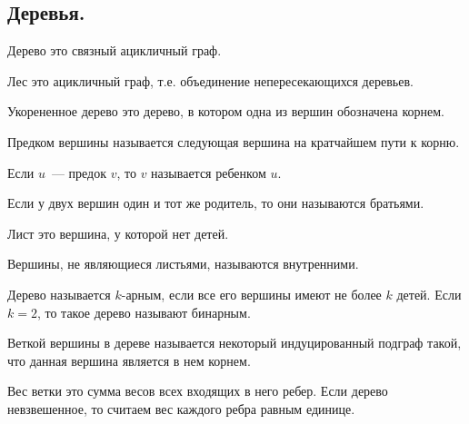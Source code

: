 \subsection{%
  Деревья.%
}

\begin{definition}
  Дерево это связный ацикличный граф.
\end{definition}

\begin{definition}
  Лес это ацикличный граф, т.е. объединение непересекающихся деревьев.
\end{definition}

\begin{definition}
  Укорененное дерево это дерево, в котором одна из вершин обозначена корнем.
\end{definition}

\begin{definition}
  Предком вершины называется следующая вершина на кратчайшем пути к корню.
\end{definition}

\begin{definition}
  Если \(u\)~--- предок \(v\), то \(v\) называется ребенком \(u\).
\end{definition}

\begin{definition}
  Если у двух вершин один и тот же родитель, то они называются братьями.
\end{definition}

\begin{definition}
  Лист это вершина, у которой нет детей.
\end{definition}

\begin{definition}
  Вершины, не являющиеся листьями, называются внутренними.
\end{definition}

\begin{definition}
  Дерево называется \(k\)-арным, если все его вершины имеют не более \(k\)
  детей. Если \(k = 2\), то такое дерево называют бинарным.
\end{definition}

\begin{definition}
  Веткой вершины в дереве называется некоторый индуцированный подграф такой, что
  данная вершина является в нем корнем.
\end{definition}

\begin{definition}
  Вес ветки это сумма весов всех входящих в него ребер. Если дерево
  невзвешенное, то считаем вес каждого ребра равным единице.
\end{definition}

